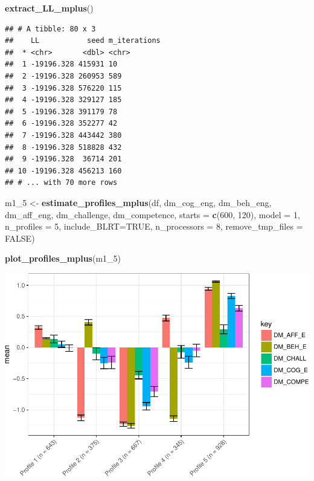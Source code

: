 \documentclass[]{book}
\newenvironment{Shaded}{\begin{snugshade}}{\end{snugshade}}
\newcommand{\KeywordTok}[1]{\textcolor[rgb]{0.13,0.29,0.53}{\textbf{#1}}}
\newcommand{\DataTypeTok}[1]{\textcolor[rgb]{0.13,0.29,0.53}{#1}}
\newcommand{\DecValTok}[1]{\textcolor[rgb]{0.00,0.00,0.81}{#1}}
\newcommand{\StringTok}[1]{\textcolor[rgb]{0.31,0.60,0.02}{#1}}
\newcommand{\OtherTok}[1]{\textcolor[rgb]{0.56,0.35,0.01}{#1}}
\newcommand{\NormalTok}[1]{#1}
\begin{document}
\begin{Shaded}
\begin{Highlighting}[]
\KeywordTok{extract_LL_mplus}\NormalTok{()}
\end{Highlighting}
\end{Shaded}

\begin{verbatim}
## # A tibble: 80 x 3
##    LL           seed m_iterations
##  * <chr>       <dbl> <chr>       
##  1 -19196.328 415931 10          
##  2 -19196.328 260953 589         
##  3 -19196.328 576220 115         
##  4 -19196.328 329127 185         
##  5 -19196.328 391179 78          
##  6 -19196.328 352277 42          
##  7 -19196.328 443442 380         
##  8 -19196.328 518828 432         
##  9 -19196.328  36714 201         
## 10 -19196.328 456213 160         
## # ... with 70 more rows
\end{verbatim}

\begin{Shaded}
\begin{Highlighting}[]
\NormalTok{m1_}\DecValTok{5}\NormalTok{ <-}\StringTok{ }\KeywordTok{estimate_profiles_mplus}\NormalTok{(df,  }
\NormalTok{                             dm_cog_eng, dm_beh_eng, dm_aff_eng, dm_challenge, dm_competence,}
                             \DataTypeTok{starts =} \KeywordTok{c}\NormalTok{(}\DecValTok{600}\NormalTok{, }\DecValTok{120}\NormalTok{),}
                             \DataTypeTok{model =} \DecValTok{1}\NormalTok{,}
                             \DataTypeTok{n_profiles =} \DecValTok{5}\NormalTok{,}
                             \DataTypeTok{include_BLRT=}\OtherTok{TRUE}\NormalTok{,}
                             \DataTypeTok{n_processors =} \DecValTok{8}\NormalTok{, }\DataTypeTok{remove_tmp_files =} \OtherTok{FALSE}\NormalTok{)}

\KeywordTok{plot_profiles_mplus}\NormalTok{(m1_}\DecValTok{5}\NormalTok{)}
\end{Highlighting}
\end{Shaded}

\includegraphics{rosenberg-dissertation_files/figure-latex/spec-solutions-model1-3.pdf}
\end{document}

